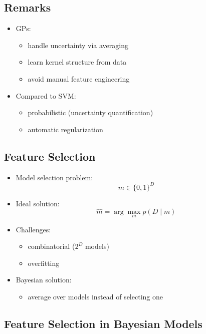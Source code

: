 \documentclass[12pt,oneside]{book}
\numberwithin{equation}{section}
\theoremstyle{definition}
\theoremstyle{plain}
\theoremstyle{remark}
\begin{document}
\subsection{Remarks}

\begin{itemize}
\item GPs:
\begin{itemize}
\item handle uncertainty via averaging
\item learn kernel structure from data
\item avoid manual feature engineering
\end{itemize}

\item Compared to SVM:
\begin{itemize}
\item probabilistic (uncertainty quantification)
\item automatic regularization
\end{itemize}
\end{itemize}

\subsection{Feature Selection}

\begin{itemize}
\item Model selection problem:
\[
m \in \{0,1\}^D
\]

\item Ideal solution:
\[
\hat{m} = \arg\max_m p(D \mid m)
\]

\item Challenges:
\begin{itemize}
\item combinatorial ($2^D$ models)
\item overfitting
\end{itemize}

\item Bayesian solution:
\begin{itemize}
\item average over models instead of selecting one
\end{itemize}
\end{itemize}

\subsection{Feature Selection in Bayesian Models}
\end{document}
